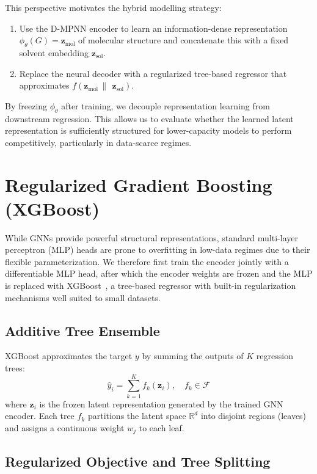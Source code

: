 This perspective motivates the hybrid modelling strategy:

\begin{enumerate}
    \item Use the D-MPNN encoder to learn an information-dense representation 
    $\phi_\theta(G) = \mathbf{z}_\mathrm{mol}$ of molecular structure and concatenate this with a fixed solvent embedding $\mathbf z_\mathrm{sol}$.
    \item Replace the neural decoder with a regularized tree-based regressor that approximates $f(\mathbf z_\mathrm{mol} \,\|\, \ \mathbf z_\mathrm{sol})$.
\end{enumerate}

By freezing $\phi_\theta$ after training, we decouple representation learning from downstream regression. This allows us to evaluate whether the learned latent representation is sufficiently structured for lower-capacity models to perform competitively, particularly in data-scarce regimes.


\section{Regularized Gradient Boosting (XGBoost)}
\label{sec:xgboost}

While GNNs provide powerful structural representations, standard multi-layer perceptron (MLP) heads are prone to overfitting in low-data regimes due to their flexible parameterization. We therefore first train the encoder jointly with a differentiable MLP head, after which the encoder weights are frozen and the MLP is replaced with XGBoost~\cite{chen2016xgboost}, a tree-based regressor with built-in regularization mechanisms well suited to small datasets.

\subsection{Additive Tree Ensemble}
XGBoost approximates the target $y$ by summing the outputs of $K$ regression trees:
\begin{equation}
    \hat{y}_i = \sum_{k=1}^K f_k(\mathbf{z}_i), \quad f_k \in \mathcal{F}
\end{equation}
where $\mathbf{z}_i$ is the frozen latent representation generated by the trained GNN encoder. Each tree $f_k$ partitions the latent space $\mathbb{R}^d$ into disjoint regions (leaves) and assigns a continuous weight $w_j$ to each leaf.

\subsection{Regularized Objective and Tree Splitting}

